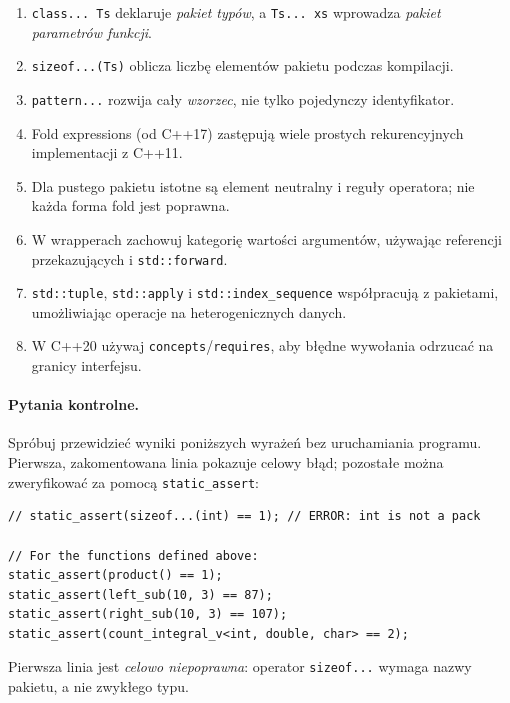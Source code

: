 \begin{enumerate}
    \item \texttt{class... Ts} deklaruje \emph{pakiet typów},
    a \texttt{Ts... xs} wprowadza \emph{pakiet parametrów funkcji}.
    \item \texttt{sizeof...(Ts)} oblicza liczbę elementów pakietu
    podczas kompilacji.
    \item \texttt{pattern...} rozwija cały \emph{wzorzec},
    nie tylko pojedynczy identyfikator.
    \item Fold expressions (od C++17) zastępują wiele prostych
    rekurencyjnych implementacji z C++11.
    \item Dla pustego pakietu istotne są element neutralny i
    reguły operatora; nie każda forma fold jest poprawna.
    \item W wrapperach zachowuj kategorię wartości argumentów,
    używając referencji przekazujących i \texttt{std::forward}.
    \item \texttt{std::tuple}, \texttt{std::apply} i
    \texttt{std::index\_sequence} współpracują z pakietami,
    umożliwiając operacje na heterogenicznych danych.
    \item W C++20 używaj \texttt{concepts}/\texttt{requires},
    aby błędne wywołania odrzucać na granicy interfejsu.
\end{enumerate}

\paragraph{Pytania kontrolne.}
Spróbuj przewidzieć wyniki poniższych wyrażeń bez uruchamiania
programu. Pierwsza, zakomentowana linia pokazuje celowy błąd;
pozostałe można zweryfikować za pomocą \texttt{static\_assert}:

\begin{lstlisting}
// static_assert(sizeof...(int) == 1); // ERROR: int is not a pack

// For the functions defined above:
static_assert(product() == 1);
static_assert(left_sub(10, 3) == 87);
static_assert(right_sub(10, 3) == 107);
static_assert(count_integral_v<int, double, char> == 2);
\end{lstlisting}

Pierwsza linia jest \emph{celowo niepoprawna}: operator
\texttt{sizeof...} wymaga nazwy pakietu, a nie zwykłego typu.

